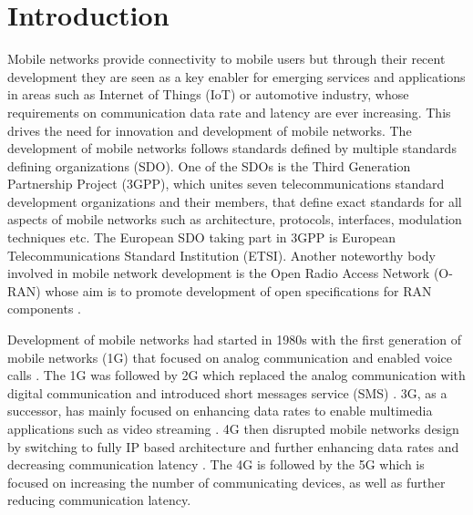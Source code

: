 \documentclass[12pt,a4paper,twoside]{report}
\begin{document}
\tableofcontents			

\glsaddallunused
\printglossary[type=\acronymtype,title={List of Abbreviations}]	%



\newpage

\setcounter{page}{1}

\chapter{Introduction}
Mobile networks provide connectivity to mobile users but through their recent development they are seen as a key enabler for emerging services and applications in areas such as Internet of Things (IoT) or automotive industry, whose requirements on communication data rate and latency are ever increasing. This drives the need for innovation and development of mobile networks. The development of mobile networks follows standards defined by multiple standards defining organizations (SDO). One of the SDOs is the Third Generation Partnership Project (3GPP), which unites seven telecommunications standard development organizations and their members, that define exact standards for all aspects of mobile networks such as architecture, protocols, interfaces, modulation techniques etc. The European SDO taking part in 3GPP is European Telecommunications Standard Institution (ETSI). Another noteworthy body involved in mobile network development is the Open Radio Access Network (O-RAN) whose aim is to promote development of open specifications for RAN components \cite{o-ran-web}. 

Development of mobile networks had started in 1980s with the first generation of mobile networks (1G) that focused on analog communication and enabled voice calls \cite{sauter2017history}. The 1G was followed by 2G which replaced the analog communication with digital communication and introduced short messages service (SMS) \cite{sauter2017history}. 3G, as a successor, has mainly focused on enhancing data rates to enable multimedia applications such as video streaming \cite{sauter2017history}. 4G then disrupted mobile networks design by switching to fully IP based architecture and further enhancing data rates and decreasing communication latency \cite{sauter2017history,dahlman-2013-4g}. The 4G is followed by the 5G which is focused on increasing the number of communicating devices, as well as further reducing communication latency. 
\end{document}
